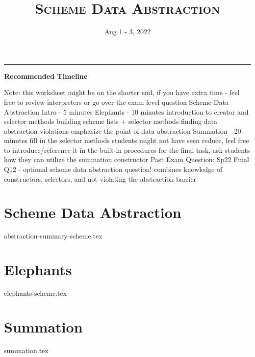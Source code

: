 \documentclass{exam}
\title{\textsc{Scheme Data Abstraction}}
\date{Aug 1 - 3, 2022}
\begin{document}
\maketitle
\rule{\textwidth}{0.15em}
\fontsize{12}{15}\selectfont

\begin{guide}
\begin{blocksection}
\textbf{Recommended Timeline}
\begin{outline}[enumerate]
    \1 Note: this worksheet might be on the shorter end, if you have extra time - feel free to review interpreters or go over the exam level question
    \1 Scheme Data Abstraction Intro - 5 minutes
    \1 Elephants - 10 minutes
    \2 introduction to creator and selector methods
    \2 building scheme lists + selector methods
    \2 finding data abstraction violations
    \2 emphasize the point of data abstraction
    \1 Summation - 20 minutes
    \2 fill in the selector methods
    \2 students might not have seen reduce, feel free to introduce/reference it in the built-in procedures
    \2 for the final task, ask students how they can utilize the summation constructor
    \1 Past Exam Question: Sp22 Final Q12 - optional
    \2 scheme data abstraction question! combines knowledge of constructors, selectors, and not violating the abstraction barrier
\end{outline} 
\end{blocksection}
\end{guide}

\section{Scheme Data Abstraction}
{abstraction-summary-scheme.tex}

\section{Elephants}
\begin{questions}
{elephants-scheme.tex}
\end{questions}
\newpage

\section{Summation}
\begin{questions}
{summation.tex}
\end{questions}
\end{document}

